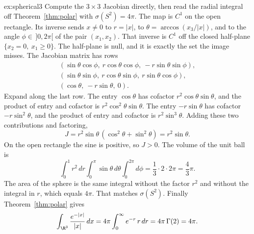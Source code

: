 \begin{solution}{ex:spherical3}
\idea Compute the $3\times 3$ Jacobian directly, then read the radial integral off Theorem~\ref{thm:polar} with $\sigma(S^2)=4\pi$.
\writeup The map is $C^1$ on the open rectangle. Its inverse sends $x\ne 0$ to $r=|x|$, to $\theta=\arccos(x_3/|x|)$, and to the angle $\phi\in\,]0,2\pi[$ of the pair $(x_1,x_2)$. That inverse is $C^1$ off the closed half-plane $\{x_2=0,\ x_1\ge 0\}$. The half-plane is null, and it is exactly the set the image misses. The Jacobian matrix has rows
\[
\begin{gathered}
(\sin\theta\cos\phi,\ r\cos\theta\cos\phi,\ -r\sin\theta\sin\phi),\\
(\sin\theta\sin\phi,\ r\cos\theta\sin\phi,\ r\sin\theta\cos\phi),\\
(\cos\theta,\ -r\sin\theta,\ 0).
\end{gathered}
\]
Expand along the last row. The entry $\cos\theta$ has cofactor $r^2\cos\theta\sin\theta$, and the product of entry and cofactor is $r^2\cos^2\theta\sin\theta$. The entry $-r\sin\theta$ has cofactor $-r\sin^2\theta$, and the product of entry and cofactor is $r^2\sin^3\theta$. Adding these two contributions and factoring,
\[
J=r^2\sin\theta\,(\cos^2\theta+\sin^2\theta)=r^2\sin\theta.
\]
On the open rectangle the sine is positive, so $J>0$. The volume of the unit ball is
\[
\int_0^1 r^2\,dr\int_0^\pi\sin\theta\,d\theta\int_0^{2\pi}d\phi=\frac13\cdot 2\cdot 2\pi=\frac43\pi.
\]
The area of the sphere is the same integral without the factor $r^2$ and without the integral in $r$, which equals $4\pi$. That matches $\sigma(S^2)$. Finally Theorem~\ref{thm:polar} gives
\[
\int_{\R^3}\frac{e^{-|x|}}{|x|}\,dx=4\pi\int_0^\infty e^{-r}\,r\,dr=4\pi\,\Gamma(2)=4\pi.
\]
\end{solution}


